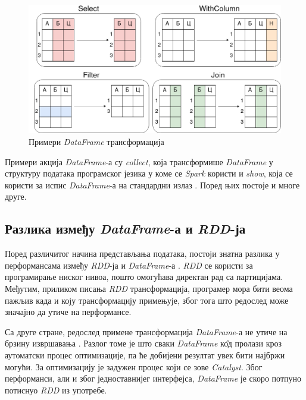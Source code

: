 \documentclass[12pt,oneside]{memoir}
\begin{document}
\begin{figure}[!ht]
  \centering
  \includegraphics[width=1\textwidth]{pictures/df_trnsf_example.png}
  \caption{Примери \textit{DataFrame} трансформација}
  \label{fig:sprk_df_trnsf_example}
\end{figure}

Примери акција \textit{DataFrame}-а су \textit{collect}, која трансформише \textit{DataFrame} у структуру података програмског језика у коме се \textit{Spark} користи и \textit{show}, која се користи за испис \textit{DataFrame}-а на стандардни излаз \cite{spark_guide}. Поред њих постоје и многе друге.

\subsection{Разлика између \textit{DataFrame}-а и \textit{RDD}-ја}
\label{subsec:spark_df_vs_rdd}

Поред различитог начина представљања података, постоји знатна разлика у перформансама између \textit{RDD}-ја и \textit{DataFrame}-а \cite{spark_guide}. \textit{RDD} се користи за програмирање ниског нивоа, пошто омогућава директан рад са партицијама. Међутим, приликом писања \textit{RDD} трансформација, програмер мора бити веома пажљив када и коју трансформацију примењује, због тога што редослед може значајно да утиче на перформансе.

Са друге стране, редослед примене трансформација \textit{DataFrame}-а не утиче на брзину извршавања \cite{spark_guide}. Разлог томе је што сваки \textit{DataFrame} к\^{о}д пролази кроз аутоматски процес оптимизације, па ће добијени резултат увек бити најбржи могући. За оптимизацију је задужен процес који се зове \textit{Catalyst}. Због перформанси, али и због једноставнијег интерфејса, \textit{DataFrame} је скоро потпуно потиснуо \textit{RDD} из употребе.
\end{document}
